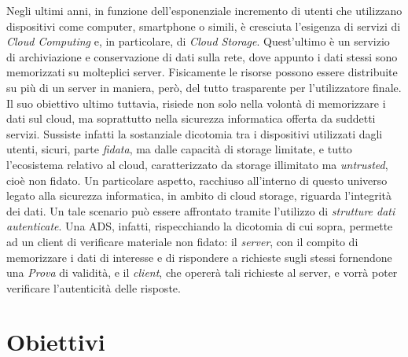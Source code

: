 
	Negli ultimi anni, in funzione dell'esponenziale incremento di utenti che utilizzano dispositivi come computer, smartphone o simili, è cresciuta l'esigenza di servizi di \textit{Cloud Computing} e, in particolare, di \textit{Cloud Storage}. Quest'ultimo è un servizio di archiviazione e conservazione di dati sulla rete, dove appunto i dati stessi sono memorizzati su molteplici server. Fisicamente le risorse possono essere distribuite su più di un server in maniera, però, del tutto trasparente per l'utilizzatore finale. Il suo obiettivo ultimo tuttavia, risiede non solo nella volontà di memorizzare i dati sul cloud, ma soprattutto nella sicurezza informatica offerta da suddetti servizi.
	Sussiste infatti la sostanziale dicotomia tra i dispositivi utilizzati dagli utenti, sicuri, parte \textit{fidata}, ma dalle capacità di storage limitate, e tutto l'ecosistema relativo al cloud, caratterizzato da storage illimitato ma \textit{untrusted}, cioè non fidato.
	Un particolare aspetto, racchiuso all'interno di questo universo legato alla sicurezza informatica, in ambito di cloud storage, riguarda l'integrità dei dati. Un tale scenario può essere affrontato tramite l'utilizzo di \textit{strutture dati autenticate}. Una ADS, infatti, rispecchiando la dicotomia di cui sopra, permette ad un client di verificare materiale non fidato: il \textit{server}, con il compito di memorizzare i dati di interesse e di rispondere a richieste sugli stessi fornendone una \textit{Prova} di validità, e il \textit{client}, che opererà tali richieste al server, e vorrà poter verificare l'autenticità delle risposte.
	
	
\section{Obiettivi}



